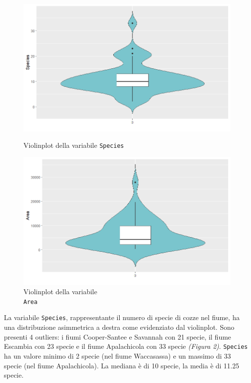 \documentclass{article} %
\begin{document}
\begin{figure}[H]
    \centering
    \begin{minipage}{0.49\textwidth}
        \centering
        \includegraphics[width=\textwidth]{immagini/vp_species.png}
        \captionsetup{justification=centering}
        \caption{Violinplot della variabile \texttt{Species}}
    \end{minipage}
    \hfill
    \begin{minipage}{0.49\textwidth}
        \centering
        \includegraphics[width=\textwidth]{immagini/vp_area.png}
        \captionsetup{justification=centering}
        \caption{Violinplot della variabile\\ \texttt{Area}}
    \end{minipage}
\end{figure}

La variabile \texttt{Species}, rappresentante il numero di specie di cozze nel fiume, ha una distribuzione asimmetrica a destra 
come evidenziato dal violinplot. Sono presenti 4 outliers: i fiumi Cooper-Santee e Savannah con 21 specie, il fiume Escambia con 23 specie e il fiume Apalachicola con 33 specie \textit{(Figura 2)}. \texttt{Species} ha un valore minimo di 2 specie (nel fiume Waccasassa) e un massimo di 33 specie (nel fiume Apalachicola). La mediana è di 10 specie, la media è di 11.25 specie.
\end{document}
